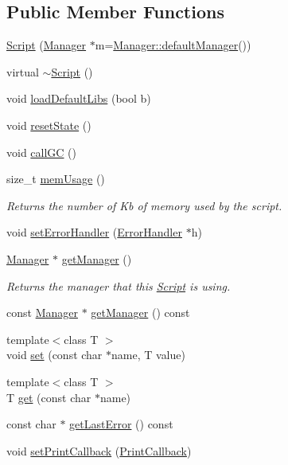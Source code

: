 \subsection*{Public Member Functions}
\begin{DoxyCompactItemize}
\item 
\hyperlink{classSLB_1_1Script_a8b811ec9a4b93babdfa34b82a9aa0b01}{Script} (\hyperlink{classSLB_1_1Manager}{Manager} $\ast$m=\hyperlink{classSLB_1_1Manager_a174e4612520c3412d10a68e659651677}{Manager\+::default\+Manager}())
\item 
virtual \hyperlink{classSLB_1_1Script_a3bb825498c578e69efc20a7ba36c9028}{$\sim$\+Script} ()
\item 
void \hyperlink{classSLB_1_1Script_a7e79e36eddef21eece679374f485d68a}{load\+Default\+Libs} (bool b)
\item 
void \hyperlink{classSLB_1_1Script_ad8b393a0d488b3239b624f19dd98678b}{reset\+State} ()
\item 
void \hyperlink{classSLB_1_1Script_a145124c72a2d02aeefcd2372358ba8b0}{call\+GC} ()
\item 
size\+\_\+t \hyperlink{classSLB_1_1Script_aad6fceba4dcfbf0cd56b0540e52c0f20}{mem\+Usage} ()
\begin{DoxyCompactList}\small\item\em Returns the number of Kb of memory used by the script. \end{DoxyCompactList}\item 
void \hyperlink{classSLB_1_1Script_ad69eabd420cf37d757c0d15c2d0df90d}{set\+Error\+Handler} (\hyperlink{classSLB_1_1ErrorHandler}{Error\+Handler} $\ast$h)
\item 
\hyperlink{classSLB_1_1Manager}{Manager} $\ast$ \hyperlink{classSLB_1_1Script_a9affefabf2b1f247f47bceffa544840b}{get\+Manager} ()
\begin{DoxyCompactList}\small\item\em Returns the manager that this \hyperlink{classSLB_1_1Script}{Script} is using. \end{DoxyCompactList}\item 
const \hyperlink{classSLB_1_1Manager}{Manager} $\ast$ \hyperlink{classSLB_1_1Script_a89b243428a8899fa3fe0773c85d7aaf0}{get\+Manager} () const 
\item 
{\footnotesize template$<$class T $>$ }\\void \hyperlink{classSLB_1_1Script_a8dccd38e45c6020be6c5cb0bbb9013a0}{set} (const char $\ast$name, T value)
\item 
{\footnotesize template$<$class T $>$ }\\T \hyperlink{classSLB_1_1Script_abbff8802bd8f6b94cb50c976126ae2ab}{get} (const char $\ast$name)
\item 
const char $\ast$ \hyperlink{classSLB_1_1Script_acad3b571031620024e74320ca25e0108}{get\+Last\+Error} () const 
\item 
void \hyperlink{classSLB_1_1Script_a276f322240b070b8d8f3495f67343910}{set\+Print\+Callback} (\hyperlink{classSLB_1_1Script_a2d7bd6aeb062fbf4ee45a73b693f389f}{Print\+Callback})
\end{DoxyCompactItemize}
